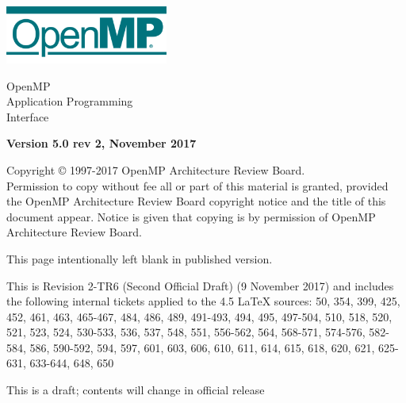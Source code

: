 
  \begin{titlepage}
    \begin{flushleft}
     \hspace{-6em} \includegraphics[width=0.4\textwidth]{openmp-logo.png}
    \end{flushleft}

    \begin{adjustwidth}{-0.75in}{0in}
    \begin{center}
      \Huge
      \textsf{OpenMP\\Application Programming\\Interface}

      \vspace{0.5in}\textsf{    }\vspace{-0.7in}
      \normalsize

      \vspace{1.0in}

      \textbf{Version 5.0 rev 2, November 2017}
    \end{center}
    \end{adjustwidth}

    \vspace{3.0in}

\begin{adjustwidth}{0pt}{1em}\setlength{\parskip}{0.25\baselineskip}%
Copyright © 1997-2017 OpenMP Architecture Review Board.\\
Permission to copy without fee all or part of this material is granted,
provided the OpenMP Architecture Review Board copyright notice and
the title of this document appear. Notice is given that copying is by
permission of OpenMP Architecture Review Board.\end{adjustwidth}

  \end{titlepage}


\clearpage
\thispagestyle{empty}
\phantom{a}
This page intentionally left blank in published version.

This is Revision 2-TR6 (Second Official Draft) (9 November 2017) and 
includes the following internal tickets applied to the 4.5 LaTeX sources: 
50, 354, 399, 425, 452, 461, 463, 465-467, 484, 486, 489, 491-493, 494, 
495, 497-504, 510, 518, 520, 521, 523, 524, 530-533, 536, 537, 548, 551, 
556-562, 564, 568-571, 574-576, 582-584, 586, 590-592, 594, 597, 601, 
603, 606, 610, 611, 614, 615, 618, 620, 621, 625-631, 633-644, 648, 
650

This is a draft; contents will change in official release

\vfill

